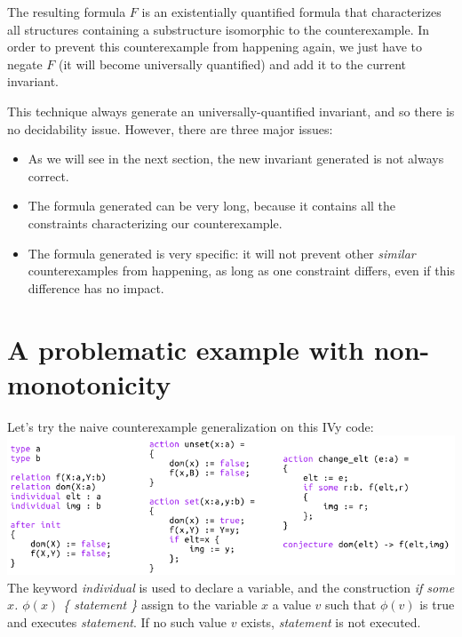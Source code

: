 \documentclass[11pt,a4paper,oldfontcommands,openany]{memoir}
\begin{document}
    The resulting formula \(F\) is an existentially quantified formula that characterizes all structures containing a substructure isomorphic to the counterexample.
    In order to prevent this counterexample from happening again, we just have to negate \(F\) (it will become universally quantified) and add it to the current invariant.

    This technique always generate an universally-quantified invariant, and so there is no decidability issue.
    However, there are three major issues:
    \begin{itemize}
        \item As we will see in the next section, the new invariant generated is not always correct.
        \item The formula generated can be very long, because it contains all the constraints characterizing our counterexample.
        \item The formula generated is very specific: it will not prevent other \textit{similar} counterexamples from happening, as long as
        one constraint differs, even if this difference has no impact.
    \end{itemize}

    \section{A problematic example with non-monotonicity}

    Let's try the naive counterexample generalization on this IVy code:\\

    \includegraphics[width=15cm]{NonMonotonicExLarge}
    \\
    The keyword \textit{individual} is used to declare a variable, and the construction \textit{if some \(x\). \(\phi(x)\) \{ statement \}}
    assign to the variable \(x\) a value \(v\) such that \(\phi(v)\) is true and executes \textit{statement}. If no such value \(v\) exists,
    \textit{statement} is not executed.
\end{document}
